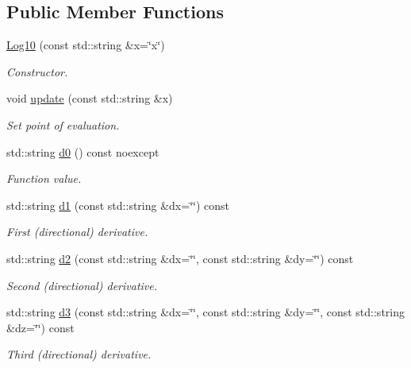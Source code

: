 \subsection*{Public Member Functions}
\begin{DoxyCompactItemize}
\item 
\hyperlink{structFunG_1_1texify_1_1Log10_ae612e34de03b93d577891342f1d537bf}{Log10} (const std\-::string \&x=\char`\"{}x\char`\"{})
\begin{DoxyCompactList}\small\item\em Constructor. \end{DoxyCompactList}\item 
void \hyperlink{structFunG_1_1texify_1_1Log10_a4a3c299d7e3c1b9ac3df21a44a06366a}{update} (const std\-::string \&x)
\begin{DoxyCompactList}\small\item\em Set point of evaluation. \end{DoxyCompactList}\item 
std\-::string \hyperlink{structFunG_1_1texify_1_1Log10_a0384f9355c5ef0cae3fc9923d3559795}{d0} () const noexcept
\begin{DoxyCompactList}\small\item\em Function value. \end{DoxyCompactList}\item 
std\-::string \hyperlink{structFunG_1_1texify_1_1Log10_ab9dadd055804d4b1f65962078b5d20a7}{d1} (const std\-::string \&dx=\char`\"{}\char`\"{}) const 
\begin{DoxyCompactList}\small\item\em First (directional) derivative. \end{DoxyCompactList}\item 
std\-::string \hyperlink{structFunG_1_1texify_1_1Log10_aac6d28a6d124725bebaad3e39e41bf84}{d2} (const std\-::string \&dx=\char`\"{}\char`\"{}, const std\-::string \&dy=\char`\"{}\char`\"{}) const 
\begin{DoxyCompactList}\small\item\em Second (directional) derivative. \end{DoxyCompactList}\item 
std\-::string \hyperlink{structFunG_1_1texify_1_1Log10_a1e7fd7a64eee30baa685d3450799e75a}{d3} (const std\-::string \&dx=\char`\"{}\char`\"{}, const std\-::string \&dy=\char`\"{}\char`\"{}, const std\-::string \&dz=\char`\"{}\char`\"{}) const 
\begin{DoxyCompactList}\small\item\em Third (directional) derivative. \end{DoxyCompactList}\end{DoxyCompactItemize}



